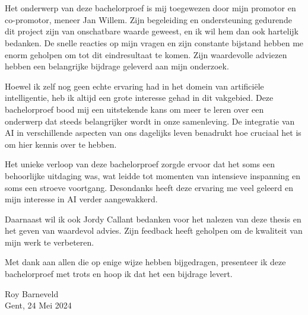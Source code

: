 
\chapter*{}%
\label{ch:voorwoord}


Het onderwerp van deze bachelorproef is mij toegewezen door mijn promotor en co-promotor, meneer Jan Willem. Zijn begeleiding en ondersteuning gedurende dit project zijn van onschatbare waarde geweest, en ik wil hem dan ook hartelijk bedanken. De snelle reacties op mijn vragen en zijn constante bijstand hebben me enorm geholpen om tot dit eindresultaat te komen. Zijn waardevolle adviezen hebben een belangrijke bijdrage geleverd aan mijn onderzoek.
\vspace{0.5cm}

Hoewel ik zelf nog geen echte ervaring had in het domein van artificiële intelligentie, heb ik altijd een grote interesse gehad in dit vakgebied. Deze bachelorproef bood mij een uitstekende kans om meer te leren over een onderwerp dat steeds belangrijker wordt in onze samenleving. De integratie van AI in verschillende aspecten van ons dagelijks leven benadrukt hoe cruciaal het is om hier kennis over te hebben.
\vspace{0.5cm}

Het unieke verloop van deze bachelorproef zorgde ervoor dat het soms een behoorlijke uitdaging was, wat leidde tot momenten van intensieve inspanning en soms een stroeve voortgang. Desondanks heeft deze ervaring me veel geleerd en mijn interesse in AI verder aangewakkerd.
\vspace{0.5cm}

Daarnaast wil ik ook Jordy Callant bedanken voor het nalezen van deze thesis en het geven van waardevol advies. Zijn feedback heeft geholpen om de kwaliteit van mijn werk te verbeteren.
\vspace{0.5cm}

Met dank aan allen die op enige wijze hebben bijgedragen, presenteer ik deze bachelorproef met trots en hoop ik dat het een bijdrage levert.

\vspace{2cm}
\begin{flushleft}
    Roy Barneveld \\
    Gent, 24 Mei 2024
\end{flushleft}